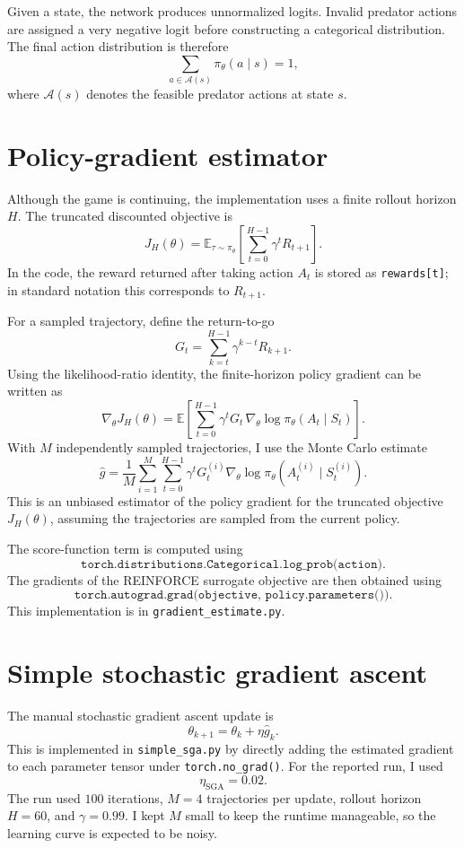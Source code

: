 \documentclass[11pt,a4paper]{article}
\begin{document}
Given a state, the network produces unnormalized logits. Invalid predator actions are assigned a very negative logit before constructing a categorical distribution. The final action distribution is therefore
\[
    \sum_{a\in\mathcal{A}(s)} \pi_\theta(a\mid s)=1,
\]
where $\mathcal{A}(s)$ denotes the feasible predator actions at state $s$.

\section{Policy-gradient estimator}
Although the game is continuing, the implementation uses a finite rollout horizon $H$. The truncated discounted objective is
\[
    J_H(\theta)=\mathbb{E}_{\tau\sim\pi_\theta}\left[\sum_{t=0}^{H-1}\gamma^t R_{t+1}\right].
\]
In the code, the reward returned after taking action $A_t$ is stored as \texttt{rewards[t]}; in standard notation this corresponds to $R_{t+1}$.

For a sampled trajectory, define the return-to-go
\[
    G_t = \sum_{k=t}^{H-1}\gamma^{k-t}R_{k+1}.
\]
Using the likelihood-ratio identity, the finite-horizon policy gradient can be written as
\[
    \nabla_\theta J_H(\theta)
    = \mathbb{E}\left[\sum_{t=0}^{H-1}\gamma^t G_t\,\nabla_\theta\log\pi_\theta(A_t\mid S_t)\right].
\]
With $M$ independently sampled trajectories, I use the Monte Carlo estimate
\[
    \widehat{g}
    = \frac{1}{M}\sum_{i=1}^{M}\sum_{t=0}^{H-1}\gamma^t G_t^{(i)}
    \nabla_\theta\log\pi_\theta(A_t^{(i)}\mid S_t^{(i)}).
\]
This is an unbiased estimator of the policy gradient for the truncated objective $J_H(\theta)$, assuming the trajectories are sampled from the current policy.

The score-function term is computed using
\[
    \texttt{torch.distributions.Categorical.log\_prob(action)}.
\]
The gradients of the REINFORCE surrogate objective are then obtained using
\[
    \texttt{torch.autograd.grad(objective, policy.parameters())}.
\]
This implementation is in \texttt{gradient\_estimate.py}.

\section{Simple stochastic gradient ascent}
The manual stochastic gradient ascent update is
\[
    \theta_{k+1}=\theta_k+\eta\widehat{g}_k.
\]
This is implemented in \texttt{simple\_sga.py} by directly adding the estimated gradient to each parameter tensor under \texttt{torch.no\_grad()}. For the reported run, I used
\[
    \eta_{\text{SGA}}=0.02.
\]
The run used $100$ iterations, $M=4$ trajectories per update, rollout horizon $H=60$, and $\gamma=0.99$. I kept $M$ small to keep the runtime manageable, so the learning curve is expected to be noisy.
\end{document}
